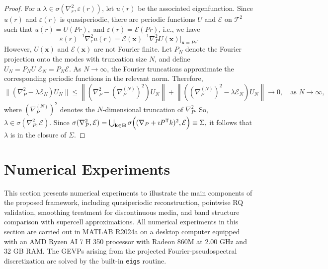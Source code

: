 \documentclass[11pt]{article}
\def\k{\mathbf{k}}
\def\x{\mathbf{x}}
\numberwithin{equation}{section}
\begin{document}
\begin{proof}
For a $\lambda \in \sigma(\nabla_r^2,\varepsilon(r))$, let $u(r)$ be the associated eigenfunction.  Since $u(r)$ and $\varepsilon(r)$ is quasiperiodic, there are periodic functions $U$ and $\mathcal{E}$ on \(\mathcal{T}^2\) such that $ u(r) = U(Pr),$ and $\varepsilon(r) = \mathcal{E}(Pr)$, i.e., we have
\begin{equation}\label{eq: infinite projection}
\varepsilon(r)^{-1} \nabla_r^2 u(r)
=
\mathcal{E}(\x)^{-1} \nabla_P^2 U(\x)\big|_{\x=Pr}.
\end{equation}
However, $U(\x)$ and $\mathcal{E}(\x)$ are not Fourier finite. Let $P_N$ denote the Fourier projection onto the modes with truncation size $N$, and define $U_N = P_N U  \,\, \mathcal{E}_N = P_N \mathcal{E}$. As $N\to\infty$, the Fourier truncations approximate the corresponding periodic functions in the relevant norm. Therefore,
\begin{equation}\label{dv: spectral trunc est}
\bigl\| (\nabla_P^2 - \lambda \mathcal{E}_N) U_N \bigr\| \leq \left\|\left(
\nabla_P^2 - \left(\nabla_P^{(N)}\right)^2
\right)U_N\right\| +
\left\|\left(
\left(\nabla_P^{(N)}\right)^2 - \lambda \mathcal{E}_N
\right)U_N\right\|
\to 0,
\quad \text{as } N \to \infty,
\end{equation}
where $\left(\nabla_P^{(N)}\right)^2$ denotes the $N$-dimensional truncation of $\nabla_P^2$. So, $\lambda \in \sigma(\nabla_P^2,\mathcal{E})$. Since $ \sigma(\nabla_P^2,\mathcal{E}) = \bigcup_{\k \in \mathbf{B}} \sigma\Bigl( (\nabla_P + \imath P^\mathsf{T} k)^2, \mathcal{E} \Bigr)\equiv \Sigma, $ it follows that $\lambda$ is in the closure of $\Sigma$.
\end{proof}

\section{Numerical Experiments}

This section presents numerical experiments to illustrate the main components of the proposed framework, including quasiperiodic reconstruction, pointwise RQ validation, smoothing treatment for discontinuous media, and band structure comparison with supercell approximations.
All numerical experiments in this section are carried out in MATLAB R2024a on a desktop computer equipped with an AMD Ryzen AI 7 H 350 processor with Radeon 860M at 2.00 GHz and 32 GB RAM. The GEVPs arising from the projected Fourier-pseudospectral discretization are solved by the built-in \texttt{eigs} routine.
\end{document}
